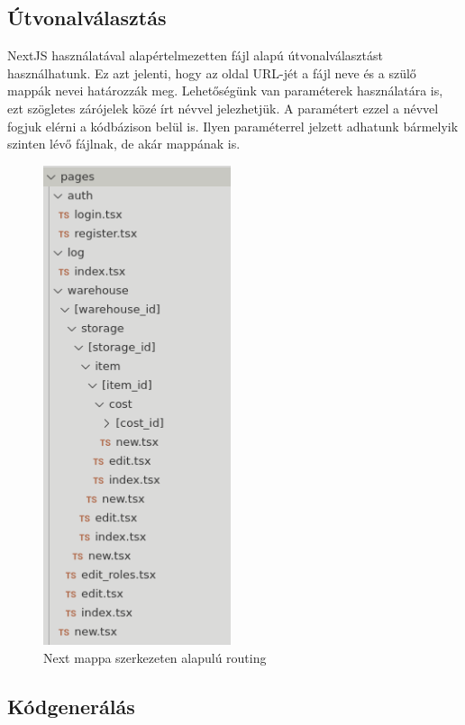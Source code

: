 
\subsection{Útvonalválasztás}
NextJS használatával alapértelmezetten fájl alapú útvonalválasztást használhatunk.
Ez azt jelenti, hogy az oldal URL-jét a fájl neve és a szülő mappák nevei határozzák meg.
Lehetőségünk van paraméterek használatára is, ezt szögletes zárójelek közé írt névvel jelezhetjük.
A paramétert ezzel a névvel fogjuk elérni a kódbázison belül is.
Ilyen paraméterrel jelzett adhatunk bármelyik szinten lévő fájlnak, de akár mappának is.

\begin{figure}[!ht]
  \centering
  \includegraphics[width=55mm, keepaspectratio]{figures/next_routing.png}
  \caption{Next mappa szerkezeten alapulú routing}
  \label{fig:NextRouting}
\end{figure}


\subsection{Kódgenerálás}

